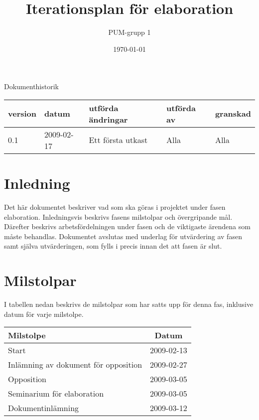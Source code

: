 

\ifpdf
\else
\fi

\title{Iterationsplan för elaboration}
\author{PUM-grupp 1}
\date{\today}



\maketitle\thispagestyle{empty}
\newpage

{\centering \Large{Dokumenthistorik\\}}

\vspace{10pt}
\begin{tabularx}{\textwidth}{ |l|l|X|l|l| }
  \hline
    \textbf{version} & \textbf{datum} & \textbf{utförda ändringar} & \textbf{utförda av} & \textbf{granskad} \\
	\hline 0.1 & 2009-02-17 & Ett första utkast & Alla & Alla \\
  \hline
\end{tabularx}

\newpage

\setcounter{tocdepth}{2}
\tableofcontents
\newpage

\section{Inledning}
Det här dokumentet beskriver vad som ska göras i projektet under fasen elaboration. Inledningsvis beskrivs fasens milstolpar och övergripande mål. Därefter beskrivs arbetsfördelningen under fasen och de viktigaste ärendena som måste behandlas. Dokumentet avslutas med underlag för utvärdering av fasen samt själva utvärderingen, som fylls i precis innan det att fasen är slut.

\section{Milstolpar}
I tabellen nedan beskrivs de milstolpar som har satts upp för denna fas, inklusive datum för varje milstolpe.

\begin{center}
	\begin{tabular}{| l | c |}
	\hline \textbf{Milstolpe} & \textbf{Datum} \\
	\hline Start & 2009-02-13 \\
	\hline Inlämning av dokument för opposition & 2009-02-27 \\
	\hline Opposition & 2009-03-05 \\
	\hline Seminarium för elaboration & 2009-03-05 \\
	\hline Dokumentinlämning & 2009-03-12 \\
	\hline
	\end{tabular}
\end{center}

